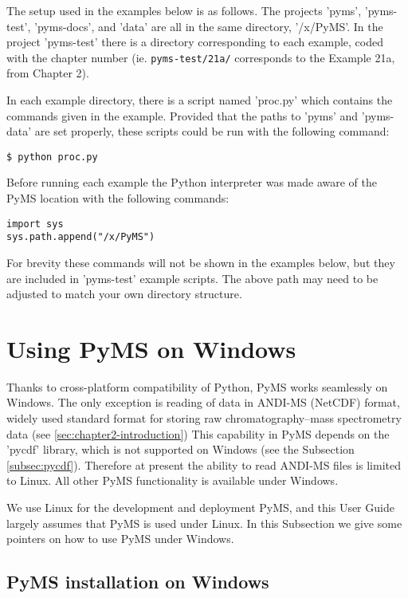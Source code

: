 The setup used in the examples below is as follows. The projects 'pyms',
'pyms-test', 'pyms-docs', and 'data' are all in the same directory,
'/x/PyMS'. In the project 'pyms-test' there is a directory corresponding
to each example, coded with the chapter number (ie. {\tt pyms-test/21a/}
corresponds to the Example 21a, from Chapter 2).

In each example directory, there is a script named 'proc.py' which
contains the commands given in the example.  Provided that the paths
to 'pyms' and 'pyms-data' are set properly, these scripts could be
run with the following command:

\begin{verbatim}
$ python proc.py
\end{verbatim}

Before running each example the Python interpreter was made aware of
the PyMS location with the following commands:

\begin{verbatim}
import sys
sys.path.append("/x/PyMS")
\end{verbatim}

For brevity these commands will not be shown in the examples below,
but they are included in 'pyms-test' example scripts.  The above
path may need to be adjusted to match your own directory structure.

\section{\label{sec:pyms-windows}Using PyMS on Windows}

Thanks to cross-platform compatibility of Python, PyMS works seamlessly
on Windows. The only exception is reading of data in ANDI-MS (NetCDF)
format, widely used standard format for storing raw
chromatography--mass spectrometry data (see \ref{sec:chapter2-introduction})
This capability in PyMS depends on the 'pycdf' library, which is not
supported on Windows (see the Subsection \ref{subsec:pycdf}). Therefore
at present the ability to read ANDI-MS files is limited to Linux. All
other PyMS functionality is available under Windows.

We use Linux for the development and deployment PyMS, and this User
Guide largely assumes that PyMS is used under Linux. In this Subsection
we give some pointers on how to use PyMS under Windows.

\subsection{PyMS installation on Windows}


